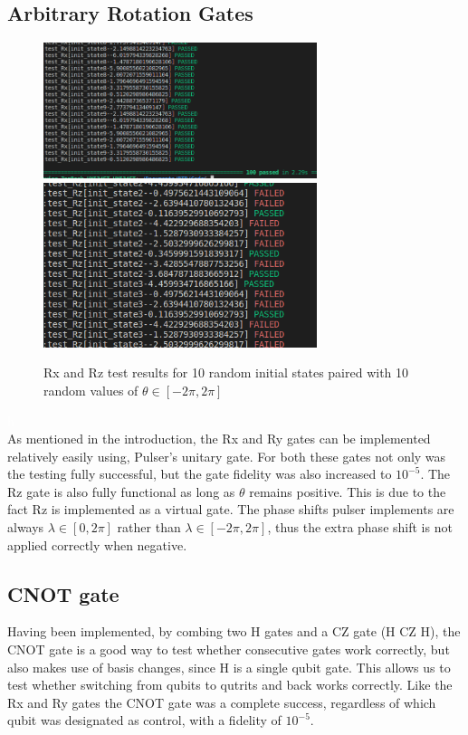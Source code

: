 \subsection{Arbitrary Rotation Gates}

\begin{figure}[H]
    \centering
    \includegraphics[width=80mm]{Images/Rx.png}\hfill
    \includegraphics[width=80mm]{Images/Rz.png}
    \caption{Rx and Rz test results for 10 random initial states paired with 10 random values of $\theta \in [-2\pi, 2\pi]$}
    \label{fig:RX}
\end{figure}
 \textcolor{white}{h} \\
As mentioned in the introduction, the Rx and Ry gates can be implemented relatively easily using, Pulser's unitary gate.
For both these gates not only was the testing fully successful, but the gate fidelity was also increased to $10^{-5}$.
The Rz gate is also fully functional as long as $\theta$ remains positive. This is due to the fact Rz is implemented as a virtual gate. The phase shifts
pulser implements are always $\lambda \in [0, 2\pi]$ rather than $\lambda \in [-2\pi, 2\pi]$, thus the extra phase shift is not applied correctly when negative.


\subsection{CNOT gate}
Having been implemented, by combing two H gates and a CZ gate (H CZ H), the CNOT gate is a good way to test whether consecutive gates work correctly, but also
makes use of basis changes, since H is a single qubit gate. This allows us to test whether switching from qubits to qutrits and back works correctly.
Like the Rx and Ry gates the CNOT gate was a complete success, regardless of which qubit was designated as control, with a fidelity of $10^{-5}$. 

